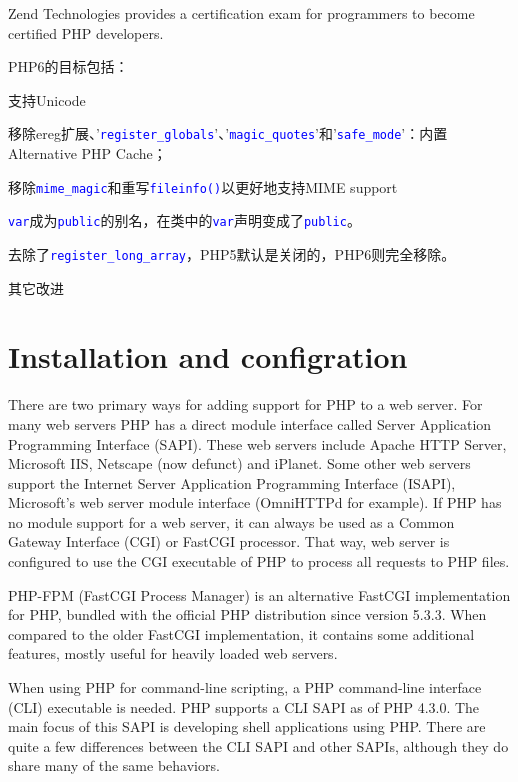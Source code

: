 Zend Technologies provides a certification exam for programmers to become certified PHP developers.

PHP6的目标包括：

\begin{compactitem}
\item 支持Unicode
\item 移除ereg扩展、'\textcolor{Blue}{\texttt{register\_globals}}'、'\textcolor{Blue}{\texttt{magic\_quotes}}'和'\textcolor{Blue}{\texttt{safe\_mode}}'：内置Alternative PHP Cache；
\item 移除\textcolor{Blue}{\texttt{mime\_magic}}和重写\textcolor{Blue}{\texttt{fileinfo()}}以更好地支持MIME support
\item \textcolor{Blue}{\texttt{var}}成为\textcolor{Blue}{\texttt{public}}的别名，在类中的\textcolor{Blue}{\texttt{var}}声明变成了\textcolor{Blue}{\texttt{public}}。
\item 去除了\textcolor{Blue}{\texttt{register\_long\_array}}，PHP5默认是关闭的，PHP6则完全移除。
\item 其它改进
\end{compactitem}




\chapter{Installation and configration}

There are two primary ways for adding support for PHP to a web server. For many web servers PHP has a direct module interface called Server Application Programming Interface (SAPI). These web servers include Apache HTTP Server, Microsoft IIS, Netscape (now defunct) and iPlanet. Some other web servers support the Internet Server Application Programming Interface (ISAPI), Microsoft's web server module interface (OmniHTTPd for example). If PHP has no module support for a web server, it can always be used as a Common Gateway Interface (CGI) or FastCGI processor. That way, web server is configured to use the CGI executable of PHP to process all requests to PHP files.


PHP-FPM (FastCGI Process Manager) is an alternative FastCGI implementation for PHP, bundled with the official PHP distribution since version 5.3.3. When compared to the older FastCGI implementation, it contains some additional features, mostly useful for heavily loaded web servers.

When using PHP for command-line scripting, a PHP command-line interface (CLI) executable is needed. PHP supports a CLI SAPI as of PHP 4.3.0. The main focus of this SAPI is developing shell applications using PHP. There are quite a few differences between the CLI SAPI and other SAPIs, although they do share many of the same behaviors.

